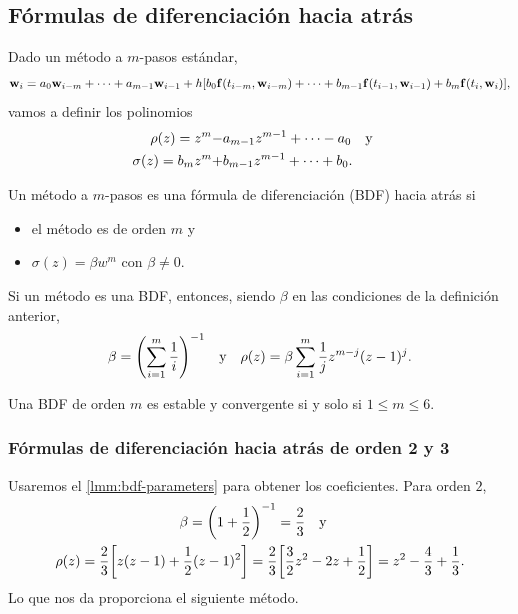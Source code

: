 \subsection{Fórmulas de diferenciación hacia atrás}

Dado un método a $m$-pasos estándar,
\begin{equation*}
    \vb{w}{}_i = a_0\vb{w}{}_{i-m} + \dots + a_{m-1}\vb{w}{}_{i-1} + h\qty[
        b_0\vb{f}{}(t_{i-m}, \vb{w}{}_{i-m}) + \dots + b_{m-1}\vb{f}{}(t_{i-1}, \vb{w}{}_{i-1})
        + b_m\vb{f}{}(t_i, \vb{w}{}_i)
    ],
\end{equation*}
vamos a definir los polinomios
\begin{align*}
    \rho(z) = z^m -& a_{m-1}z^{m-1} + \dots - a_0 \qq{y} \\
    \sigma(z) = b_mz^m +& b_{m-1}z^{m-1} + \dots + b_0.
\end{align*}

\begin{definition}
    Un método a $m$-pasos es una fórmula de diferenciación (BDF) hacia atrás si
    \begin{itemize}
        \item el método es de orden $m$ y
        \item $\sigma(z) = \beta w^m$ con $\beta \ne 0$.
    \end{itemize}
\end{definition}

\begin{lemma}\label{lmm:bdf-parameters}
    Si un método es una BDF, entonces,
    siendo $\beta$ en las condiciones de la definición anterior,
    \begin{equation*}
        \beta = \qty(\sum_{i=1}^m \frac{1}{i})^{-1} \qq{y}
        \rho(z) = \beta\sum_{i=1}^m \frac{1}{j}z^{m-j}(z-1)^j.
    \end{equation*}
\end{lemma}

\begin{theorem}
    Una BDF de orden $m$ es estable y convergente si y solo si $1 \le m \le 6$.
\end{theorem}

\subsubsection{Fórmulas de diferenciación hacia atrás de orden 2 y 3}

Usaremos el \cref{lmm:bdf-parameters} para obtener los coeficientes.
Para orden $2$,
\begin{gather*}
    \beta = \qty(1 + \frac{1}{2})^{-1} = \frac{2}{3} \qq{y} \\
    \rho(z) = \frac{2}{3}\qty[z(z-1) + \frac{1}{2}(z-1)^2] =
    \frac{2}{3}\qty[\frac{3}{2}z^2 - 2z + \frac{1}{2}] =
    z^2 - \frac{4}{3} + \frac{1}{3}.
\end{gather*}
Lo que nos da proporciona el siguiente método.

